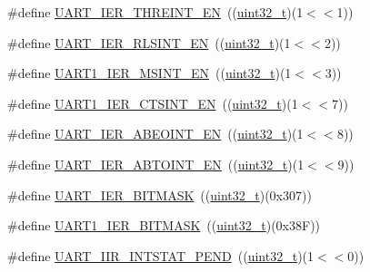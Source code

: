 \begin{DoxyCompactItemize}
\item 
\#define \hyperlink{group___u_a_r_t___private___macros_ga6ad0b05af9d9599e6ce9dd5521c2aa74}{U\+A\+R\+T\+\_\+\+I\+E\+R\+\_\+\+T\+H\+R\+E\+I\+N\+T\+\_\+\+EN}~((\hyperlink{_p_e___types_8h_a33594304e786b158f3fb30289278f5af}{uint32\+\_\+t})(1$<$$<$1))
\item 
\#define \hyperlink{group___u_a_r_t___private___macros_ga11515e64ac0353023a4b62a9ca5ad0ae}{U\+A\+R\+T\+\_\+\+I\+E\+R\+\_\+\+R\+L\+S\+I\+N\+T\+\_\+\+EN}~((\hyperlink{_p_e___types_8h_a33594304e786b158f3fb30289278f5af}{uint32\+\_\+t})(1$<$$<$2))
\item 
\#define \hyperlink{group___u_a_r_t___private___macros_ga8c0039a611efc20fc28d344406d3e2cc}{U\+A\+R\+T1\+\_\+\+I\+E\+R\+\_\+\+M\+S\+I\+N\+T\+\_\+\+EN}~((\hyperlink{_p_e___types_8h_a33594304e786b158f3fb30289278f5af}{uint32\+\_\+t})(1$<$$<$3))
\item 
\#define \hyperlink{group___u_a_r_t___private___macros_ga3e1fdb6a9caf561de81d24821cb51f17}{U\+A\+R\+T1\+\_\+\+I\+E\+R\+\_\+\+C\+T\+S\+I\+N\+T\+\_\+\+EN}~((\hyperlink{_p_e___types_8h_a33594304e786b158f3fb30289278f5af}{uint32\+\_\+t})(1$<$$<$7))
\item 
\#define \hyperlink{group___u_a_r_t___private___macros_ga370755782fbd47ad2c33ad281462bf45}{U\+A\+R\+T\+\_\+\+I\+E\+R\+\_\+\+A\+B\+E\+O\+I\+N\+T\+\_\+\+EN}~((\hyperlink{_p_e___types_8h_a33594304e786b158f3fb30289278f5af}{uint32\+\_\+t})(1$<$$<$8))
\item 
\#define \hyperlink{group___u_a_r_t___private___macros_gac6579cde413efce70ee1103ef278368f}{U\+A\+R\+T\+\_\+\+I\+E\+R\+\_\+\+A\+B\+T\+O\+I\+N\+T\+\_\+\+EN}~((\hyperlink{_p_e___types_8h_a33594304e786b158f3fb30289278f5af}{uint32\+\_\+t})(1$<$$<$9))
\item 
\#define \hyperlink{group___u_a_r_t___private___macros_ga101e57e41855d1262e9d9b747854542f}{U\+A\+R\+T\+\_\+\+I\+E\+R\+\_\+\+B\+I\+T\+M\+A\+SK}~((\hyperlink{_p_e___types_8h_a33594304e786b158f3fb30289278f5af}{uint32\+\_\+t})(0x307))
\item 
\#define \hyperlink{group___u_a_r_t___private___macros_ga145046fd9bd1d318acffd4770a7432ec}{U\+A\+R\+T1\+\_\+\+I\+E\+R\+\_\+\+B\+I\+T\+M\+A\+SK}~((\hyperlink{_p_e___types_8h_a33594304e786b158f3fb30289278f5af}{uint32\+\_\+t})(0x38\+F))
\item 
\#define \hyperlink{group___u_a_r_t___private___macros_gab5fadcd32fca709aece83c05f8be1901}{U\+A\+R\+T\+\_\+\+I\+I\+R\+\_\+\+I\+N\+T\+S\+T\+A\+T\+\_\+\+P\+E\+ND}~((\hyperlink{_p_e___types_8h_a33594304e786b158f3fb30289278f5af}{uint32\+\_\+t})(1$<$$<$0))
$$
\end{DoxyCompactItemize}
